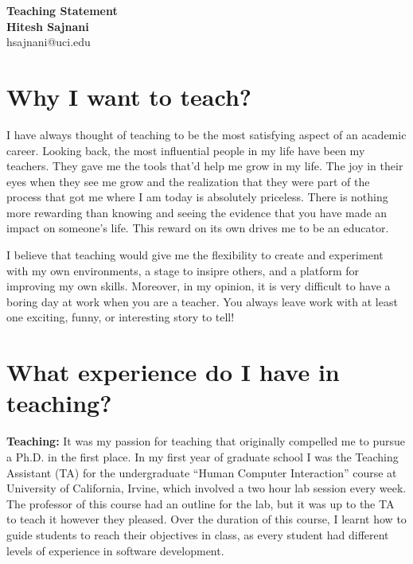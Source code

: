 \documentclass[a4paper]{article}
\begin{document}

\begin{center}
{\LARGE \textbf{Teaching Statement}} \\[.3in]
{\large  \textbf{Hitesh Sajnani}} \\
{\small hsajnani@uci.edu}
\end{center}
\pagestyle{fancy}
\lhead{\textcolor{black}{\it Hitesh Sajnani}}
\rhead{\textcolor{black}{\thepage/\pageref{LastPage}}}



\section*{Why I want to teach?}
I have always thought of teaching to be the most satisfying aspect of an academic career. Looking back, the most influential people in my life have been my teachers. 
They gave me the tools that'd help me grow in my life. The joy in their eyes when they see me grow and the realization that they were part of the process that got me where I am today is absolutely priceless.  
There is nothing more rewarding than knowing and seeing the evidence that you have made an impact on someone’s life. This reward on its own drives me to be an educator. 

I believe that teaching would give me the flexibility to create and experiment with my own environments, a stage to insipre others, and a platform for improving my own skills.  
Moreover, in my opinion, it is very difficult to have a boring day at work when you are a teacher. You always leave work with at least one exciting, funny, or interesting story to tell!

\section*{What experience do I have in teaching?}
\textbf{Teaching:} It was my passion for teaching that originally compelled me to pursue a Ph.D. in the first
place. In my first year of graduate school I was the Teaching Assistant (TA) for the undergraduate
\enquote{Human Computer Interaction} course at University of California, Irvine, which involved a two hour lab session
every week. The professor of this course had an outline for the lab, but it was up to the TA to teach it however they pleased. Over the
duration of this course,  I learnt how to guide students to reach their objectives in class, as every student had different levels of experience in software development. 
\end{document}

